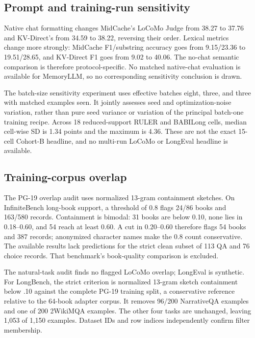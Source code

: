 \subsection{Prompt and training-run sensitivity}

Native chat formatting changes MidCache's LoCoMo Judge from 38.27 to 37.76 and KV-Direct's from 34.59 to 38.22, reversing their order. Lexical metrics change more strongly: MidCache F1/substring accuracy goes from 9.15/23.36 to 19.51/28.65, and KV-Direct F1 goes from 9.02 to 40.06. The no-chat semantic comparison is therefore protocol-specific. No matched native-chat evaluation is available for MemoryLLM, so no corresponding sensitivity conclusion is drawn.

The batch-size sensitivity experiment uses effective batches eight, three, and three with matched examples seen. It jointly assesses seed and optimization-noise variation, rather than pure seed variance or variation of the principal batch-one training recipe. Across 18 reduced-support RULER and BABILong cells, median cell-wise SD is 1.34 points and the maximum is 4.36. These are not the exact 15-cell Cohort-B headline, and no multi-run LoCoMo or LongEval headline is available.

\subsection{Training-corpus overlap}
\label{app:clean-longbench}
The PG-19 overlap audit uses normalized 13-gram containment sketches. On InfiniteBench long-book support, a threshold of 0.8 flags 24/86 books and 163/580 records. Containment is bimodal: 31 books are below 0.10, none lies in 0.18--0.60, and 54 reach at least 0.60. A cut in 0.20--0.60 therefore flags 54 books and 387 records; anonymized character names make the 0.8 count conservative. The available results lack predictions for the strict clean subset of 113 QA and 76 choice records. That benchmark's book-quality comparison is excluded.

The natural-task audit finds no flagged LoCoMo overlap; LongEval is synthetic. For LongBench, the strict criterion is normalized 13-gram sketch containment below .10 against the complete PG-19 training split, a conservative reference relative to the 64-book adapter corpus. It removes 96/200 NarrativeQA examples and one of 200 2WikiMQA examples. The other four tasks are unchanged, leaving 1,053 of 1,150 examples. Dataset IDs and row indices independently confirm filter membership.


